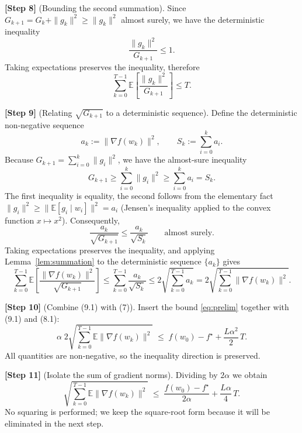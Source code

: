 \documentclass{article}
\begin{document}
\noindent\textbf{[Step 8]} (Bounding the second summation).  
Since $G_{k+1}=G_k+\|g_k\|^{2}\ge\|g_k\|^{2}$ almost surely, we have the deterministic inequality
\[
\frac{\|g_k\|^{2}}{G_{k+1}}\le 1 .
\]
Taking expectations preserves the inequality, therefore
\[
\sum_{k=0}^{T-1}\mathbb{E}\!\left[\frac{\|g_k\|^{2}}{G_{k+1}}\right]\le T .
\tag{8.1}
\]

\noindent\textbf{[Step 9]} (Relating $\sqrt{G_{k+1}}$ to a deterministic sequence).  
Define the deterministic non‑negative sequence
\[
a_k:=\|\nabla f(w_k)\|^{2},\qquad
S_k:=\sum_{i=0}^{k}a_i .
\]
Because $G_{k+1}= \sum_{i=0}^{k}\|g_i\|^{2}$, we have the almost‑sure inequality
\[
G_{k+1}\ge \sum_{i=0}^{k}\|g_i\|^{2}\ge \sum_{i=0}^{k}a_i = S_k .
\]
The first inequality is equality, the second follows from the elementary fact
$\|g_i\|^{2}\ge\|\mathbb{E}[g_i\mid w_i]\|^{2}=a_i$ (Jensen’s inequality applied to the convex function $x\mapsto x^{2}$).  Consequently,
\[
\frac{a_k}{\sqrt{G_{k+1}}}\le\frac{a_k}{\sqrt{S_k}}\qquad\text{almost surely}.
\]
Taking expectations preserves the inequality, and applying Lemma~\ref{lem:summation} to the deterministic sequence $\{a_k\}$ gives
\begin{equation}
\sum_{k=0}^{T-1}\mathbb{E}\!\left[\frac{\|\nabla f(w_k)\|^{2}}{\sqrt{G_{k+1}}}\right]
\le
\sum_{k=0}^{T-1}\frac{a_k}{\sqrt{S_k}}
\le 2\sqrt{\sum_{k=0}^{T-1}a_k}
=2\sqrt{\sum_{k=0}^{T-1}\|\nabla f(w_k)\|^{2}} .
\tag{9.1}
\end{equation}

\noindent\textbf{[Step 10]} (Combine (9.1) with (7)).  
Insert the bound \eqref{eq:prelim} together with (9.1) and (8.1):
\[
\alpha\;2\sqrt{\sum_{k=0}^{T-1}\mathbb{E}\|\nabla f(w_k)\|^{2}}
\;\le\;
f(w_0)-f^{\star}
+\frac{L\alpha^{2}}{2}\,T .
\]
All quantities are non‑negative, so the inequality direction is preserved.

\noindent\textbf{[Step 11]} (Isolate the sum of gradient norms).  
Dividing by $2\alpha$ we obtain
\begin{equation}
\sqrt{\sum_{k=0}^{T-1}\mathbb{E}\|\nabla f(w_k)\|^{2}}
\;\le\;
\frac{f(w_0)-f^{\star}}{2\alpha}
+\frac{L\alpha}{4}\,T .
\tag{11.1}
\end{equation}
No squaring is performed; we keep the square‑root form because it will be eliminated in the next step.
\end{document}
